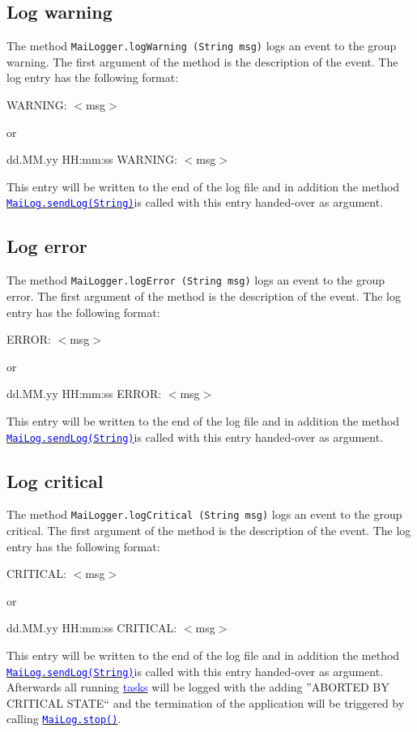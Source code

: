 \documentclass{article}
\newcommand{\refh}[2]{\hyperref[#1] {\textcolor{blue}{#2}}}
\newcommand{\sendLog}{\refh{setup_interface}{\lstinline|MaiLog.sendLog(String)|}}
\newcommand{\MaiLogStop}{\refh{setup_interface}{\lstinline|MaiLog.stop()|}}
\begin{document}
    \subsection{Log warning}
    \label{logging_warning}
    The method \lstinline|MaiLogger.logWarning (String msg)| logs an event to the group warning.
    The first argument of the method is the description of the event.
    The log entry has the following format:
    \begin{description}
        \item WARNING: $<$msg$>$
        \item or
        \item dd.MM.yy HH:mm:ss WARNING: $<$msg$>$
    \end{description}
    This entry will be written to the end of the log file and in addition the method \sendLog is called with this entry handed-over as argument.

    \subsection{Log error}
    \label{logging_error}
    The method \lstinline|MaiLogger.logError (String msg)| logs an event to the group error.
    The first argument of the method is the description of the event.
    The log entry has the following format:
    \begin{description}
        \item ERROR: $<$msg$>$
        \item or
        \item dd.MM.yy HH:mm:ss ERROR: $<$msg$>$
    \end{description}
    This entry will be written to the end of the log file and in addition the method \sendLog is called with this entry handed-over as argument.

    \subsection{Log critical}
    \label{logging_critical}
    The method \lstinline|MaiLogger.logCritical (String msg)| logs an event to the group critical.
    The first argument of the method is the description of the event.
    The log entry has the following format:
    \begin{description}
        \item CRITICAL: $<$msg$>$
        \item or
        \item dd.MM.yy HH:mm:ss CRITICAL: $<$msg$>$
    \end{description}
    This entry will be written to the end of the log file and in addition the method \sendLog is called with this entry handed-over as argument.
    Afterwards all running \refh{tasks}{tasks} will be logged with the adding ''ABORTED BY CRITICAL STATE`` and the termination of the application will be triggered by calling \MaiLogStop.
\end{document}
